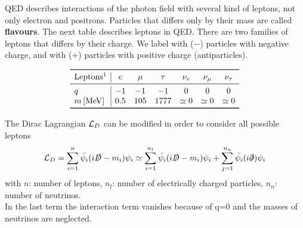 \documentclass[TheoreticalPhy_ModB.tex]{subfiles}
\begin{document}
QED describes interactions of the photon field with several kind of leptons, not only electron and positrons. Particles that differs only by their mass are called \textbf{flavours}.
The next table describes leptons in QED. There are two families of leptons that differs by their charge. We label with ($-$) particles with negative charge, and with ($+$) particles with positive charge (antiparticles).

\[
\begin{array}{l | cccccc}
\toprule
\text{Leptons} \footnotemark	& e 		& \mu 	& \tau 	& \nu_e 		& \nu_{\mu} 	& \nu_{\tau} \\
\midrule
q					& -1		& -1		& -1		& 0			& 0			& 0 \\
m\, [\text{MeV}]				& 0.5		& 105	& 1777	& \simeq 0		& \simeq 0		& \simeq 0 \\
\bottomrule
\end{array}
\]

The Dirac Lagrangian $\mathcal{L}_D$ can be modified in order to consider all possible leptons
\[
\mathcal{L}_D = \sum_{i=1}^n \bar{\psi_i} (i \slashed D - m_i) \psi_i
	\simeq \sum_{i=1}^{n_l} \bar{\psi_i} (i \slashed D - m_i) \psi_i
	+ \sum_{j=1}^{n_n} \bar{\psi_i} (i \slashed \partial) \psi_i
\]
with $n$: number of leptons, $n_l$: number of electrically charged particles, $n_n$: number of neutrinos.\\
In the last term the interaction term vanishes because of q=0 and the masses of neutrinos are neglected. 
\end{document}
